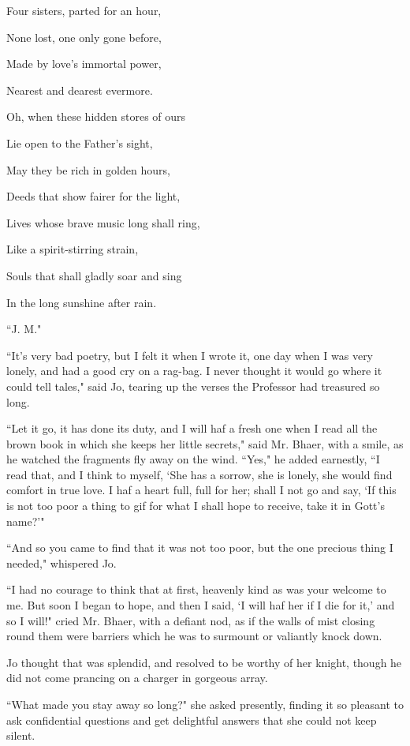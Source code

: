 Four sisters, parted for an hour,

None lost, one only gone before,

Made by love's immortal power,

Nearest and dearest evermore.

Oh, when these hidden stores of ours

Lie open to the Father's sight,

May they be rich in golden hours,

Deeds that show fairer for the light,

Lives whose brave music long shall ring,

Like a spirit-stirring strain,

Souls that shall gladly soar and sing

In the long sunshine after rain.

``J. M."

``It's very bad poetry, but I felt it when I wrote it,
one day when I was very lonely, and had a good cry on a rag-bag. I never
thought it would go where it could tell tales," said Jo, tearing up the
verses the Professor had treasured so long.

``Let it go, it has done its duty, and I will haf a fresh one when I read
all the brown book in which she keeps her little secrets," said Mr.
Bhaer, with a smile, as he watched the fragments fly away on the wind.
``Yes," he added earnestly, ``I read that, and I think to myself,
`She has a sorrow, she is lonely, she would find comfort
in true love. I haf a heart full, full for her; shall I not go and say,
`If this is not too poor a thing to gif for what I shall
hope to receive, take it in Gott's
name?'"

``And so you came to find that it was not too poor, but the one precious
thing I needed," whispered Jo.

``I had no courage to think that at first, heavenly kind as was your
welcome to me. But soon I began to hope, and then I said,
`I will haf her if I die for it,' and
so I will!" cried Mr. Bhaer, with a defiant nod, as if the walls of mist
closing round them were barriers which he was to surmount or valiantly
knock down.

Jo thought that was splendid, and resolved to be worthy of her knight,
though he did not come prancing on a charger in gorgeous array.

``What made you stay away so long?" she asked presently, finding it so
pleasant to ask confidential questions and get delightful answers that
she could not keep silent.

